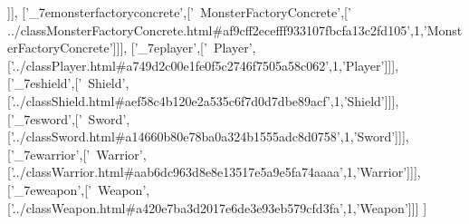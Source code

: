 \begin{DoxyCode}
  [\textcolor{stringliteral}{'\_7emonsterfactory'},[\textcolor{stringliteral}{'~MonsterFactory'},[\textcolor{stringliteral}{'../classMonsterFactory.html#a74cde2805c7f4fd26807f4e2f96c681d'},
      1,\textcolor{stringliteral}{'MonsterFactory'}]]],
  [\textcolor{stringliteral}{'\_7emonsterfactoryconcrete'},[\textcolor{stringliteral}{'~MonsterFactoryConcrete'},[\textcolor{stringliteral}{'
      ../classMonsterFactoryConcrete.html#af9cff2ecefff933107fbcfa13c2fd105'},1,\textcolor{stringliteral}{'MonsterFactoryConcrete'}]]],
  [\textcolor{stringliteral}{'\_7eplayer'},[\textcolor{stringliteral}{'~Player'},[\textcolor{stringliteral}{'../classPlayer.html#a749d2c00e1fe0f5c2746f7505a58c062'},1,\textcolor{stringliteral}{'Player'}]]],
  [\textcolor{stringliteral}{'\_7eshield'},[\textcolor{stringliteral}{'~Shield'},[\textcolor{stringliteral}{'../classShield.html#aef58c4b120e2a535c6f7d0d7dbe89acf'},1,\textcolor{stringliteral}{'Shield'}]]],
  [\textcolor{stringliteral}{'\_7esword'},[\textcolor{stringliteral}{'~Sword'},[\textcolor{stringliteral}{'../classSword.html#a14660b80e78ba0a324b1555adc8d0758'},1,\textcolor{stringliteral}{'Sword'}]]],
  [\textcolor{stringliteral}{'\_7ewarrior'},[\textcolor{stringliteral}{'~Warrior'},[\textcolor{stringliteral}{'../classWarrior.html#aab6dc963d8e8e13517e5a9e5fa74aaaa'},1,\textcolor{stringliteral}{'Warrior'}]]],
  [\textcolor{stringliteral}{'\_7eweapon'},[\textcolor{stringliteral}{'~Weapon'},[\textcolor{stringliteral}{'../classWeapon.html#a420e7ba3d2017e6de3e93eb579cfd3fa'},1,\textcolor{stringliteral}{'Weapon'}]]]
]
\end{DoxyCode}
